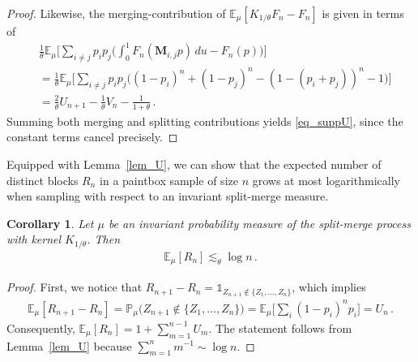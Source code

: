 \documentclass[a4paper,11pt]{article}
\newcommand{\EE}{\mathbb{E}}
\newcommand{\PP}{\mathbb{P}}
\numberwithin{equation}{section}
\newtheorem{corollary}[theorem]{Corollary}
\begin{document}
\begin{proof}
Likewise, the merging-contribution of $ \EE_{\mu} [K_{1/ \theta} F_{n}-F_{n}]$ is given in terms of 
\begin{equation*}
\begin{aligned}
	&\frac{1}{\theta} 
\EE_{\mu}\bigg[
	\sum_{i \neq j } p_{i}p_{j}\bigg(
	\int_{0}^{1} F_{n}(\mathbf{M}_{i,j}p) \, du -F_{n}(p)\bigg)
\bigg]\\
&=
\frac{1}{ \theta}
\EE_{\mu}\bigg[
	\sum_{i \neq j } p_{i}p_{j}\Big( (1-p_{i})^{n} + (1-p_{j})^{n}- (1-(p_{i}+p_{j}))^{n}-1\Big)
\bigg]\\
& = \frac{2}{\theta}  U_{n+1} - \frac{1}{\theta} V_{n}
- \frac{1}{1+ \theta}\,.
\end{aligned}
\end{equation*}
Summing both merging and splitting contributions yields \eqref{eq_suppU}, since the constant terms cancel precisely.
\end{proof}

Equipped with Lemma~\ref{lem_U}, we can show that the expected number of distinct blocks $ R_{n}$ in a paintbox sample of size $n$ grows at most logarithmically when sampling with respect to an invariant split-merge measure.

\begin{corollary}\label{cor_R}
Let $ \mu$ be an invariant probability measure of the split-merge process with kernel $ K_{1/ \theta} $. Then 
\begin{equation*}
\begin{aligned}
\EE_{\mu}[ R_{n}] \lesssim_{\theta} \log{n}\,.
\end{aligned}
\end{equation*}
\end{corollary}

\begin{proof}
First, we notice that 
$
R_{n+1} - R_{n} = \mathds{1}_{Z_{n+1} \notin \{Z_{1}, \ldots, Z_{n}\}}
$,
which implies
\begin{equation*}
\begin{aligned}
\EE_{\mu}[ R_{n+1} - R_{n}] 
=
\PP_{\mu} \big( Z_{n+1} \notin \{Z_{1}, \ldots, Z_{n}\}\big)
=
\EE_{\mu} \bigg[ \sum_{i} (1- p_{i})^{n} p_{i}\bigg]= U_{n}\,.
\end{aligned}
\end{equation*}
Consequently, 
$
\EE_{\mu} [ R_{n}] 
=
1+\sum_{m=1}^{n-1} U_{m}
$. The statement follows from Lemma~\ref{lem_U} because $ \sum_{m=1}^{n} m^{-1} \sim \log{n }$. 
\end{proof}
\end{document}
